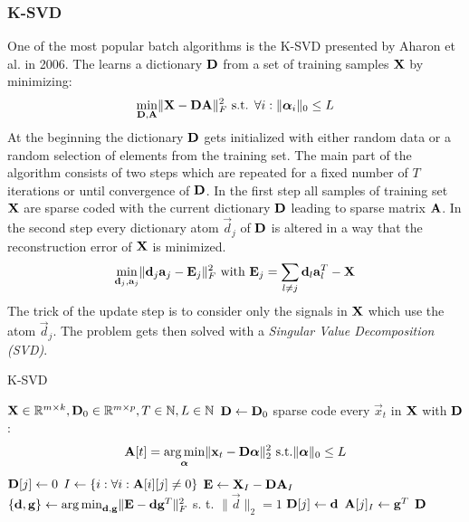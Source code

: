 \subsubsection{K-SVD}
\label{sec:k-svd}
One of the most popular batch algorithms is the K-SVD presented by
Aharon et al. in 2006\cite{Aharon2006}. The  learns a
dictionary
$\boldsymbol{\mathrm{D}}$ from a set of training samples $\boldsymbol{\mathrm{X}}$ by minimizing:
\begin{equation*}
\min_{\boldsymbol{\mathrm{D}},\boldsymbol{\mathrm{A}}} \lVert \boldsymbol{\mathrm{X}} - \boldsymbol{\mathrm{D}}\boldsymbol{\mathrm{A}} \rVert^{2}_{F} \textrm{
s.t. }
\forall i : \lVert \boldsymbol{\mathrm{\alpha}}_i \rVert_{0} \leq L
\end{equation*}
At the beginning the dictionary $\boldsymbol{\mathrm{D}}$ gets initialized with either random
data or a random selection of elements from the training set. The main part of
the algorithm consists of two steps which are repeated for a fixed number of $T$
iterations or until convergence of $\boldsymbol{\mathrm{D}}$. In the first step all samples of
training set $\boldsymbol{\mathrm{X}}$ are sparse coded with the current dictionary $\boldsymbol{\mathrm{D}}$
leading to sparse matrix $\boldsymbol{\mathrm{A}}$. In the second step every dictionary atom
$\vec{d}_j$ of $\boldsymbol{\mathrm{D}}$ is altered in a way that the reconstruction error of
$\boldsymbol{\mathrm{X}}$ is minimized. 
\begin{equation*}
\min_{\boldsymbol{\mathrm{d}}_j,\boldsymbol{\mathrm{a}}_j} \lVert \boldsymbol{\mathrm{d}}_j\boldsymbol{\mathrm{a}}_j - \boldsymbol{\mathrm{E}}_j \rVert^{2}_{F}
\textrm{ with }
\boldsymbol{\mathrm{E}}_j = \sum_{l\neq j} \boldsymbol{\mathrm{d}}_l\boldsymbol{\mathrm{a}}_l^T - \boldsymbol{\mathrm{X}}
\end{equation*} 
The trick of the update step is to consider only the signals in $\boldsymbol{\mathrm{X}}$ which
use the atom $\vec{d}_j$. The problem gets then solved with a \emph{Singular
Value Decomposition (SVD)}. 

\begin{algorithm}[h]
\caption{K-SVD}
\label{alg:k-svd}
\begin{algorithmic}[1]
\REQUIRE $\boldsymbol{\mathrm{X}} \in \mathbb{R}^{m \times k}, \boldsymbol{\mathrm{D}}_0 \in \mathbb{R}^{m
\times p}, T \in \mathbb{N}, L \in \mathbb{N}$
\STATE $\boldsymbol{\mathrm{D	}} \gets \boldsymbol{\mathrm{D}}_0$
\STATE sparse code every $\vec{x}_t$ in $\boldsymbol{\mathrm{X}}$ with $\boldsymbol{\mathrm{D}}$:
\begin{equation}
\boldsymbol{\mathrm{A}}[t] = \operatorname*{arg\,min}_{\boldsymbol{\mathrm{\alpha}}}\lVert
\boldsymbol{\mathrm{x}}_t - \boldsymbol{\mathrm{D}}\boldsymbol{\mathrm{\alpha}}\rVert_2^2 \text{ s.t.}
\lVert\boldsymbol{\mathrm{\alpha}}\rVert_0 \leq L
\end{equation}
\label{alg:k-svd_start}
\STATE $\boldsymbol{\mathrm{D}}[j] \gets 0$
\STATE $I \gets \{ i : \forall i : \boldsymbol{\mathrm{A}}[i][j] \neq 0 \}$
\STATE $\boldsymbol{\mathrm{E}} \gets \boldsymbol{\mathrm{X}}_I - \boldsymbol{\mathrm{D}}\boldsymbol{\mathrm{A}}_I$
\STATE $\{\boldsymbol{\mathrm{d}},\boldsymbol{\mathrm{g}}\} \gets \operatorname*{arg\,min}_{\boldsymbol{\mathrm{d}},\boldsymbol{\mathrm{g}}} \lVert \boldsymbol{\mathrm{E}}-
\boldsymbol{\mathrm{d}}\boldsymbol{\mathrm{g}}^T \rVert_F^{2}$ s. t. $\lVert
\vec{d} \rVert_{2} = 1$
\STATE $\boldsymbol{\mathrm{D}}[j] \gets \boldsymbol{\mathrm{d}}$
\STATE $\boldsymbol{\mathrm{A}}[j]_{I} \gets \boldsymbol{\mathrm{g}}^T$
\ENDFOR\label{alg:k-svd_end}
\ENDFOR
\RETURN $\boldsymbol{\mathrm{D}}$
\end{algorithmic}
\end{algorithm}

